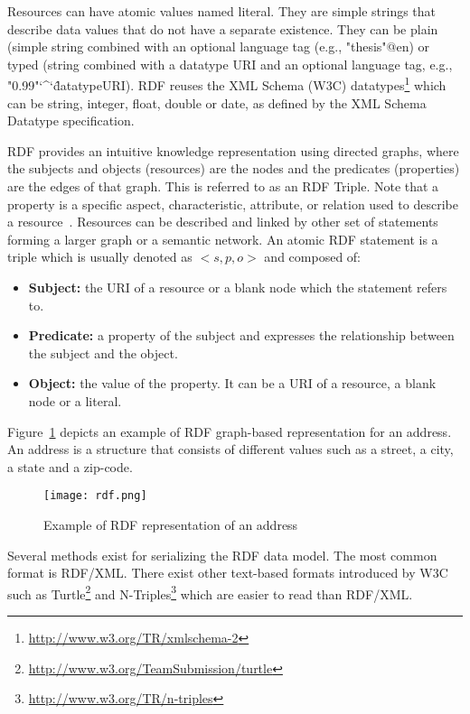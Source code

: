 Resources can have atomic values named literal. They are simple strings that describe data values that do not have a separate existence. They can be plain (simple string combined with an optional language tag (e.g., "thesis"@en) or typed (string combined with a datatype URI and an optional language tag, e.g., "0.99"\char`\^\char`\^datatypeURI). RDF reuses the  XML Schema (W3C) datatypes\footnote{\url{http://www.w3.org/TR/xmlschema-2}} which can be string, integer, float, double or date, as defined by the XML Schema Datatype specification.

RDF provides an intuitive knowledge representation using directed graphs, where the subjects and objects (resources) are the nodes and the predicates (properties) are the edges of that graph. This is referred to as an RDF Triple. Note that a property is a specific aspect, characteristic, attribute, or relation used to describe a resource~\cite{Lassila:RDF:99}. Resources can be described and linked by other set of statements forming a larger graph or a semantic network. An atomic RDF statement is a triple which is usually denoted as $<s,p,o>$ and composed of:

\begin{itemize}
	\item \textbf{Subject:} the URI of a resource or a blank node which the statement refers to.
	\item \textbf{Predicate:} a property of the subject and expresses the relationship between the subject and the object.
	\item \textbf{Object:} the value of the property. It can be a URI of a resource, a blank node or a literal.
\end{itemize}

Figure~\ref{fig:rdfGraph} depicts an example of RDF graph-based representation for an address. An address is a structure that consists of different values such as a street, a city, a state and a zip-code.

\begin{figure}[htbp]
\centering
	\texttt{[image: rdf.png]}
	\caption{Example of RDF representation of an address}
	\label{fig:rdfGraph}
\end{figure}

Several methods exist for serializing the RDF data model. The most common format is RDF/XML. There exist other text-based formats introduced by W3C such as Turtle\footnote{\url{http://www.w3.org/TeamSubmission/turtle}} and N-Triples\footnote{\url{http://www.w3.org/TR/n-triples}} which are easier to read than RDF/XML.

